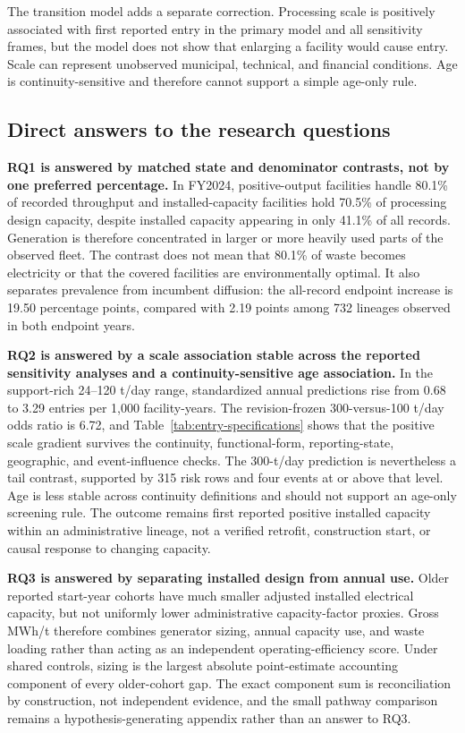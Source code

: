 \documentclass[12pt,a4paper]{article}
\begin{document}
The transition model adds a separate correction. Processing scale is positively
associated with first reported entry in the primary model and all sensitivity
frames, but the model does not show that enlarging a facility would cause entry.
Scale can represent unobserved municipal, technical, and financial conditions.
Age is continuity-sensitive and therefore cannot support a simple age-only rule.

\subsection{Direct answers to the research questions}

\textbf{RQ1 is answered by matched state and denominator contrasts, not by one
preferred percentage.} In FY2024, positive-output facilities handle 80.1\% of
recorded throughput and installed-capacity facilities hold 70.5\% of processing
design capacity, despite installed capacity appearing in only 41.1\% of all
records. Generation is therefore concentrated in larger or more heavily used
parts of the observed fleet. The contrast does not mean that 80.1\% of waste
becomes electricity or that the covered facilities are environmentally optimal.
It also separates prevalence from incumbent diffusion: the all-record endpoint
increase is 19.50 percentage points, compared with 2.19 points among 732
lineages observed in both endpoint years.

\textbf{RQ2 is answered by a scale association stable across the reported
sensitivity analyses and a continuity-sensitive age association.} In the
support-rich 24--120 t/day range, standardized annual predictions rise from
0.68 to 3.29 entries per 1,000 facility-years. The revision-frozen
300-versus-100 t/day odds ratio is 6.72, and
Table~\ref{tab:entry-specifications} shows that the positive scale gradient
survives the continuity, functional-form, reporting-state, geographic, and
event-influence checks. The 300-t/day prediction is nevertheless a tail
contrast, supported by 315 risk rows and four events at or above that level.
Age is less stable across continuity definitions and should not support an
age-only screening rule. The outcome remains first reported positive installed
capacity within an administrative lineage, not a verified retrofit,
construction start, or causal response to changing capacity.

\textbf{RQ3 is answered by separating installed design from annual use.} Older
reported start-year cohorts have much smaller adjusted installed electrical
capacity, but not uniformly lower administrative capacity-factor proxies. Gross
MWh/t therefore combines generator sizing, annual capacity use, and waste
loading rather than acting as an independent operating-efficiency score. Under
shared controls, sizing is the largest absolute point-estimate accounting
component of every older-cohort gap. The exact component sum is reconciliation
by construction, not independent evidence, and the small pathway comparison
remains a hypothesis-generating appendix rather than an answer to RQ3.
\end{document}
